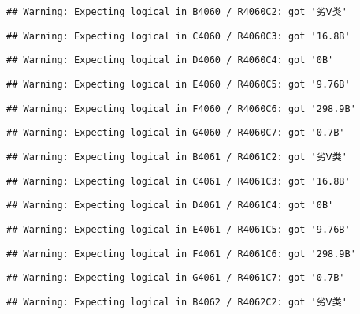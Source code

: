 \documentclass[
]{article}
\begin{document}
\begin{verbatim}
## Warning: Expecting logical in B4060 / R4060C2: got '劣Ⅴ类'
\end{verbatim}

\begin{verbatim}
## Warning: Expecting logical in C4060 / R4060C3: got '16.8B'
\end{verbatim}

\begin{verbatim}
## Warning: Expecting logical in D4060 / R4060C4: got '0B'
\end{verbatim}

\begin{verbatim}
## Warning: Expecting logical in E4060 / R4060C5: got '9.76B'
\end{verbatim}

\begin{verbatim}
## Warning: Expecting logical in F4060 / R4060C6: got '298.9B'
\end{verbatim}

\begin{verbatim}
## Warning: Expecting logical in G4060 / R4060C7: got '0.7B'
\end{verbatim}

\begin{verbatim}
## Warning: Expecting logical in B4061 / R4061C2: got '劣Ⅴ类'
\end{verbatim}

\begin{verbatim}
## Warning: Expecting logical in C4061 / R4061C3: got '16.8B'
\end{verbatim}

\begin{verbatim}
## Warning: Expecting logical in D4061 / R4061C4: got '0B'
\end{verbatim}

\begin{verbatim}
## Warning: Expecting logical in E4061 / R4061C5: got '9.76B'
\end{verbatim}

\begin{verbatim}
## Warning: Expecting logical in F4061 / R4061C6: got '298.9B'
\end{verbatim}

\begin{verbatim}
## Warning: Expecting logical in G4061 / R4061C7: got '0.7B'
\end{verbatim}

\begin{verbatim}
## Warning: Expecting logical in B4062 / R4062C2: got '劣Ⅴ类'
\end{verbatim}
\end{document}
